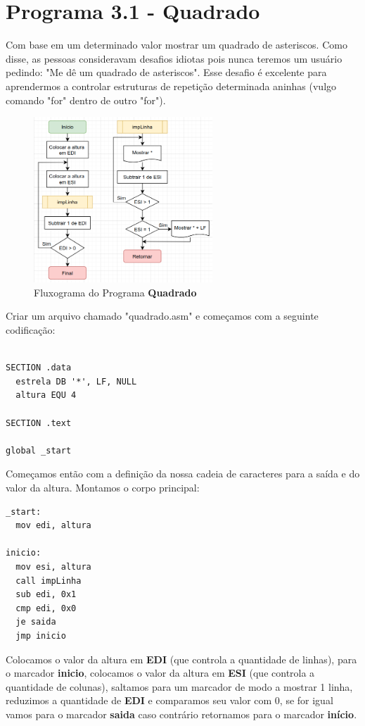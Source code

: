 \section{Programa 3.1 - Quadrado}
Com base em um determinado valor mostrar um quadrado de asteriscos. Como disse, as pessoas consideravam desafios idiotas pois nunca teremos um usuário pedindo: "Me dê um quadrado de asteriscos". Esse desafio é excelente para aprendermos a controlar estruturas de repetição determinada aninhas (vulgo comando "for" dentro de outro "for"). 
\begin{figure}[H]
	\centering
	\includegraphics[width=0.6\textwidth]{Pictures/cap03/programa10}
	\caption{Fluxograma do Programa \textbf{Quadrado}}
\end{figure}

Criar um arquivo chamado "quadrado.asm" e começamos com a seguinte codificação:
\begin{lstlisting}[]
%include 'bibliotecaE.inc'

SECTION .data
  estrela DB '*', LF, NULL
  altura EQU 4

SECTION .text

global _start
\end{lstlisting}

Começamos então com a definição da nossa cadeia de caracteres para a saída e do valor da altura. Montamos o corpo principal:
\begin{lstlisting}[]
_start:
  mov edi, altura

inicio:
  mov esi, altura
  call impLinha
  sub edi, 0x1
  cmp edi, 0x0
  je saida
  jmp inicio	
\end{lstlisting}

Colocamos o valor da altura em \textbf{EDI} (que controla a quantidade de linhas), para o marcador \textbf{inicio}, colocamos o valor da altura em \textbf{ESI} (que controla a quantidade de colunas), saltamos para um marcador de modo a mostrar 1 linha, reduzimos a quantidade de \textbf{EDI} e comparamos seu valor com 0, se for igual vamos para o marcador \textbf{saida} caso contrário retornamos para o marcador \textbf{início}.

